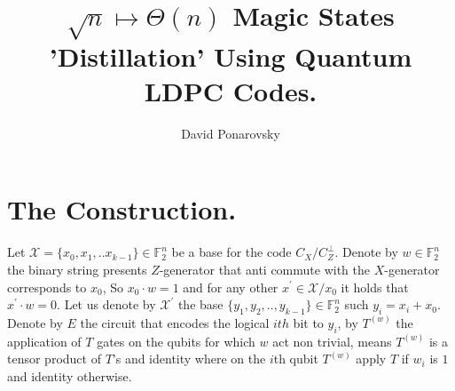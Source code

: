 \documentclass[manuscript,screen,review]{acmart}
\begin{document}

\title{ $\sqrt{n} \mapsto \Theta(n)$  Magic States 'Distillation' Using
Quantum LDPC Codes. }
\author{David Ponarovsky}
\maketitle

\newcommand*{\Mbas}{\mathcal{X}^\prime}

\section{The Construction.}

Let $\mathcal{X} = \{x_{0}, x_{1}, .. x_{k-1}\} \in \mathbb{F}_{2}^{n}$ be a
base for the code $C_{X}/C_{Z}^\perp$.  Denote by $w \in \mathbb{F}_{2}^{n}$
the binary string presents $Z$-generator that anti commute with the
$X$-generator corresponds to $x_{0}$, So $x_{0}\cdot w = 1$ and for any other
$x^\prime \in \mathcal{X}/x_{0}$ it holds that $x^{\prime}\cdot w = 0 $. Let
us denote by $\Mbas$ the base $\{ y_{1}, y_{2}, .., y_{k-1} \} \in
\mathbb{F}_{2}^{n}$ such $y_{i}= x_{i} + x_{0}$. Denote by $E$ the circuit
that encodes the logical $ith$ bit to $y_{i}$, by $T^{(w)}$ the application of
$T$ gates on the qubits for which $w$ act non trivial, means $T^{(w)}$ is a
tensor product of $T$'s and identity where on the $i$th qubit $T^{(w)}$ apply
$T$ if $w_{i}$ is $1$ and identity otherwise.

%

\printbibliography
\end{document}
